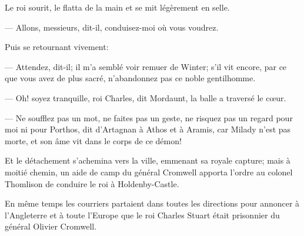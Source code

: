 Le roi sourit, le flatta de la main et se mit légèrement en selle.

— Allons, messieurs, dit-il, conduisez-moi où vous voudrez.

Puis se retournant vivement:

— Attendez, dit-il; il m'a semblé voir remuer de Winter; s'il vit encore, par ce que vous avez de plus sacré, n'abandonnez pas ce noble gentilhomme.

— Oh! soyez tranquille, roi Charles, dit Mordaunt, la balle a traversé le cœur.

— Ne soufflez pas un mot, ne faites pas un geste, ne risquez pas un regard pour moi ni pour Porthos, dit d'Artagnan à Athos et à Aramis, car Milady n'est pas morte, et son âme vit dans le corps de ce démon!

Et le détachement s'achemina vers la ville, emmenant sa royale capture; mais à moitié chemin, un aide de camp du général Cromwell apporta l'ordre au colonel Thomlison de conduire le roi à Holdenby-Castle.

En même temps les courriers partaient dans toutes les directions pour annoncer à l'Angleterre et à toute l'Europe que le roi Charles Stuart était prisonnier du général Olivier Cromwell.